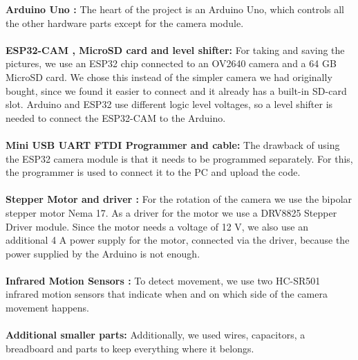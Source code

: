 \documentclass{article}
\begin{document}
\textbf{Arduino Uno \cite{arduino}:} The heart of the project is an Arduino Uno, which controls all the other hardware parts except for the camera module.\\
\\
\textbf{ESP32-CAM \cite{esp32cam}, MicroSD card and level shifter:} For taking and saving the pictures, we use an ESP32 chip connected to an OV2640 camera and a 64 GB MicroSD card. We chose this instead of the simpler camera we had originally bought, since we found it easier to connect and it already has a built-in SD-card slot. Arduino and ESP32 use different logic level voltages, so a level shifter is needed to connect the ESP32-CAM to the Arduino.\\
\\
\textbf{Mini USB UART FTDI Programmer \cite{programmer} and cable:} The drawback of using the ESP32 camera module is that it needs to be programmed separately. For this, the programmer is used to connect it to the PC and upload the code.\\
\\
\textbf{Stepper Motor \cite{stepperMotor} and driver \cite{driver}:} For the rotation of the camera we use the bipolar stepper motor Nema 17. As a driver for the motor we use a DRV8825 Stepper Driver module. Since the motor needs a voltage of 12 V, we also use an additional 4 A power supply for the motor, connected via the driver, because the power supplied by the Arduino is not enough.\\
\\
\textbf{Infrared Motion Sensors  \cite{sensors}:} To detect movement, we use two HC-SR501 infrared motion sensors that indicate when and on which side of the camera movement happens.\\
\\
\textbf{Additional smaller parts:} Additionally, we used wires, capacitors, a breadboard and parts to keep everything where it belongs.

\newpage
\end{document}
